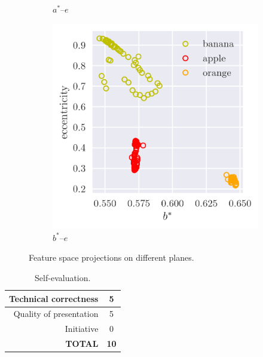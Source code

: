 \documentclass[12pt,a4paper]{article}
\begin{document}
\begin{figure}[htb]
\begin{subfigure}[h!]{0.3\textwidth}
		\caption{$a^*$--$e$}
		\label{fig:ae-space}
	\end{subfigure}
	\begin{subfigure}[h!]{0.3\textwidth}
		\centering
		\includegraphics[width=\textwidth]{be_space.png}
		\caption{$b^*$--$e$}
		\label{fig:be-space}
	\end{subfigure}
	\caption{Feature space projections on different planes.}
	\label{fig:projections}
\end{figure}

\clearpage
\begin{table}[!htb]
	\centering
	\caption{Self-evaluation.}
	\begin{tabular}{||r|c||}
		\hline
		Technical correctness & 5 \\ \hline
		Quality of presentation & 5 \\ \hline
		Initiative & 0 \\ \hline
		\textbf{TOTAL} & \textbf{10} \\ \hline
	\end{tabular}
	\label{tab:self-eval}
\end{table}



\end{document}
